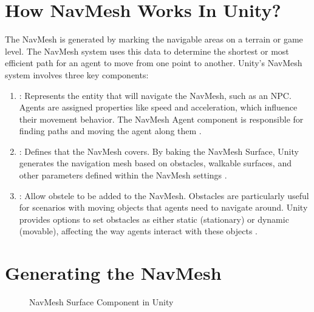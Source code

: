 \documentclass[letterpaper,10pt,english]{jupyterBook}
\begin{document}
\section{How NavMesh Works In Unity?}
\label{\detokenize{Navmesh:how-navmesh-works-in-unity}}
\sphinxAtStartPar
Τhe NavMesh is generated by marking the navigable areas on a terrain or game level. The NavMesh system uses this data to determine the shortest or most efficient path for an agent to move from one point to another. Unity’s NavMesh system involves three key components:
\begin{enumerate}
%
\item {} 
\sphinxAtStartPar
{}: Represents the entity that will navigate the NavMesh, such as an NPC. Agents are assigned properties like speed and acceleration, which influence their movement behavior. The NavMesh Agent component is responsible for finding paths and moving the agent along them .

\item {} 
\sphinxAtStartPar
{}: Defines that the NavMesh covers. By baking the NavMesh Surface, Unity generates the navigation mesh based on obstacles, walkable surfaces, and other parameters defined within the NavMesh settings .

\item {} 
\sphinxAtStartPar
{}: Allow obstele to be added to the NavMesh. Obstacles are particularly useful for scenarios with moving objects that agents need to navigate around. Unity provides options to set obstacles as either static (stationary) or dynamic (movable), affecting the way agents interact with these objects .

\end{enumerate}


\section{Generating the NavMesh}
\label{\detokenize{Navmesh:generating-the-navmesh}}
\begin{figure}[htbp]
\centering
\capstart

\noindent{}
\caption{NavMesh Surface Component in Unity}\label{\detokenize{Navmesh:navmesh-surface}}\end{figure}
\end{document}

